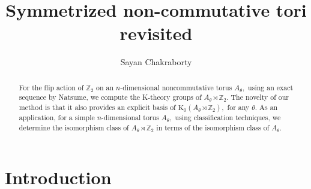 \documentclass[9pt, BCOR=2mm]{amsart}
\title{Symmetrized non-commutative tori revisited}  %
\author[S.~Chakraborty]{Sayan Chakraborty}
\numberwithin{equation}{section}
\numberwithin{equation}{section}
\newcommand{\Z}{{\mathbb{Z}}}
\newcommand{\K}{\mathrm{K}} %
\begin{document}
\begin{abstract}
For the flip action of $\Z_2$ on an $n$-dimensional noncommutative torus $A_\theta,$ using an exact sequence by Natsume, we compute the K-theory groups of $A_\theta \rtimes \Z_2$. The novelty of our method is that it also provides an explicit basis of $\K_{0}(A_{\theta}\rtimes \Z_2),$ for any $\theta.$ As an application, for a simple $n$-dimensional torus $A_{\theta},$ using classification techniques, we determine the isomorphism class of $A_{\theta}\rtimes \Z_2$ in terms of the isomorphism class of $A_{\theta}.$

\end{abstract}

\maketitle \pagestyle{myheadings} 


\section*{Introduction}\label{sec:intro}
\end{document}
